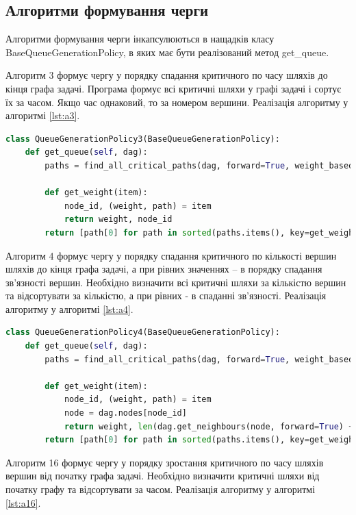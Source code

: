 \subsection{Алгоритми формування черги}
Алгоритми формування черги інкапсулюються в нащадків класу BaseQueueGenerationPolicy, в яких має бути реалізований метод get\_queue.

Алгоритм 3 формує чергу у порядку спадання критичного по часу шляхів до кінця графа задачі. Програма формує всі критичні шляхи у графі задачі і сортує їх за часом. Якщо час однаковий, то за номером вершини. Реалізація алгоритму у алгоритмі \ref{lst:a3}.

\begin{lstlisting}[language=Python,caption={Алгоритм 3},label=lst:a3]
class QueueGenerationPolicy3(BaseQueueGenerationPolicy):
    def get_queue(self, dag):
        paths = find_all_critical_paths(dag, forward=True, weight_based=True)

        def get_weight(item):
            node_id, (weight, path) = item
            return weight, node_id
        return [path[0] for path in sorted(paths.items(), key=get_weight, reverse=True)]

\end{lstlisting}

Алгоритм 4 формує чергу у порядку спадання критичного по кількості вершин шляхів до кінця графа задачі, а при рівних значеннях – в порядку спадання зв’язності вершин. Необхідно визначити всі критичні шляхи за кількістю вершин та відсортувати за кількістю, а при рівних - в спаданні зв'язності.  Реалізація алгоритму у алгоритмі \ref{lst:a4}.

\begin{lstlisting}[language=Python,caption={Алгоритм 4},label=lst:a4]
class QueueGenerationPolicy4(BaseQueueGenerationPolicy):
    def get_queue(self, dag):
        paths = find_all_critical_paths(dag, forward=True, weight_based=False)

        def get_weight(item):
            node_id, (weight, path) = item
            node = dag.nodes[node_id]
            return weight, len(dag.get_neighbours(node, forward=True) + dag.get_neighbours(node, forward=False))
        return [path[0] for path in sorted(paths.items(), key=get_weight, reverse=True)]

\end{lstlisting}

Алгоритм 16 формує чергу у порядку зростання критичного по часу шляхів вершин від початку графа задачі. Необхідно визначити критичні шляхи від початку графу та відсортувати за часом. Реалізація алгоритму у алгоритмі \ref{lst:a16}.

